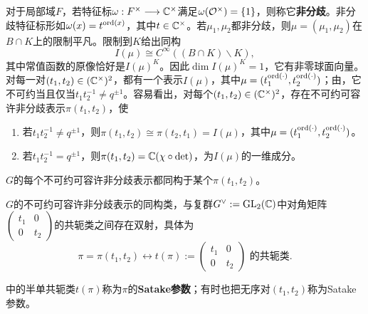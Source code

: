 对于局部域$F$，若特征标$\omega:F^\times\longrightarrow\mathbb{C}^\times$满足$\omega(\mathcal O^\times)=\{1\}$，则称它\textbf{非分歧}。非分歧特征标形如$\omega(x)=t^{\operatorname{ord}(x)}$，其中$t\in\mathbb{C}^\times$。若$\mu_1,\mu_2$都非分歧，则$\mu=(\mu_1,\mu_2)$在$B\cap K$上的限制平凡。限制到$K$给出同构
\[I(\mu)\cong C^\infty((B\cap K)\backslash K),\]
其中常值函数的原像恰好是$I(\mu)^K$。因此$\dim I(\mu)^K=1$，它有非零球面向量。对每一对$(t_1,t_2)\in(\mathbb{C}^\times)^2$，都有一个表示$I(\mu)$，其中$\mu=(t_1^{\operatorname{ord}(\cdot)},t_2^{\operatorname{ord}(\cdot)})$；由，它不可约当且仅当$t_1t_2^{-1}\ne q^{\pm1}$。容易看出，对每个$(t_1,t_2)\in(\mathbb{C}^\times)^2$，存在不可约可容许非分歧表示$\pi(t_1,t_2)$，使
\begin{enumerate}[label=(\arabic*)]
\item 若$t_1t_2^{-1}\ne q^{\pm1}$，则$\pi(t_1,t_2)\cong\pi(t_2,t_1)=I(\mu)$，其中$\mu=(t_1^{\operatorname{ord}(\cdot)},t_2^{\operatorname{ord}(\cdot)})$。
\item 若$t_1t_2^{-1}=q^{\pm1}$，则$\pi(t_1,t_2)=\mathbb{C}(\chi\circ\det)$，为$I(\mu)$的一维成分。
\end{enumerate}
\begin{theorem}\label{L5S3O4}
$G$的每个不可约可容许非分歧表示都同构于某个$\pi(t_1,t_2)$。
\end{theorem}
\begin{corollary}\label{L5S3O5}
$G$的不可约可容许非分歧表示的同构类，与复群$G^\vee:=\operatorname{GL}_2(\mathbb{C})$中对角矩阵$\begin{pmatrix}t_1&0\\0&t_2\end{pmatrix}$的共轭类之间存在双射，具体为
\[\pi=\pi(t_1,t_2)\longleftrightarrow t(\pi):=\begin{pmatrix}t_1&0\\0&t_2\end{pmatrix}\text{ 的共轭类}.\]
\end{corollary}
中的半单共轭类$t(\pi)$称为$\pi$的\textbf{Satake参数}；有时也把无序对$(t_1,t_2)$称为Satake参数。

